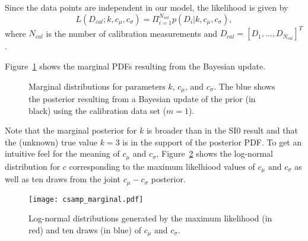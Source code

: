 \documentclass[11pt]{article}
\begin{document}
Since the data points are independent in our model, the likelihood is given by
%
\begin{equation*}
L(D_{cal}; k, c_{\mu}, c_{\sigma}) = \Pi_{i=1}^{N_{cal}} p(D_i | k, c_{\mu}, c_{\sigma} ),
\end{equation*}
%
where $N_{cal}$ is the number of calibration measurements and $D_{cal}
= [D_1, \ldots, D_{N_{cal}}]^T$.

Figure~\ref{fig:si2_params} shows the marginal PDFs resulting from the
Bayesian update.
%
\begin{figure}[ht]
\begin{center}
\end{center}
\caption{Marginal distributions for parameters $k$, $c_{\mu}$, and $c_{\sigma}$.  The
  blue shows the posterior resulting from a Bayesian update of the
  prior (in black) using the calibration data set ($m=1$).}
\label{fig:si2_params}
\end{figure}
% 
Note that the marginal posterior for $k$ is broader than in the SI0
result and that the (unknown) true value $k = 3$ is in the support of
the posterior PDF.  To get an intuitive feel for the meaning of
$c_{\mu}$ and $c_{\sigma}$, Figure~\ref{fig:si2_csamp} shows the
log-normal distribution for $c$ corresponding to the maximum
likelhiood values of $c_{\mu}$ and $c_{\sigma}$ as well as ten draws
from the joint $c_{\mu}-c_{\sigma}$ posterior.
%
\begin{figure}[ht]
\begin{center}
\texttt{[image: csamp\_marginal.pdf]}
\end{center}
\caption{Log-normal distributions generated by the maximum likelihood (in red) and ten draws (in blue) of $c_{\mu}$ and $c_{\sigma}$.}
\label{fig:si2_csamp}
\end{figure}
%
\end{document}
